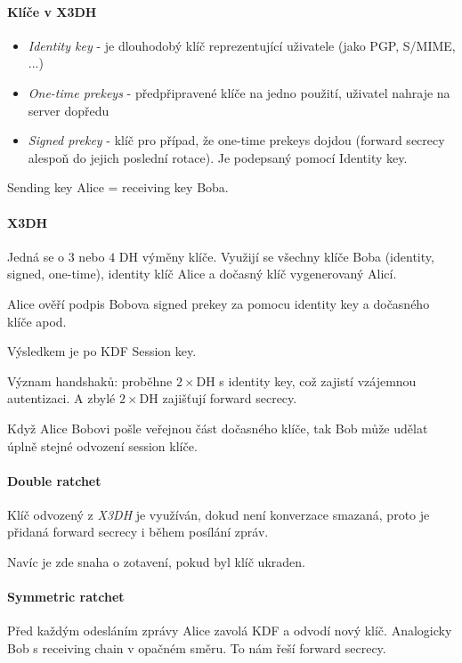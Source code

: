 \documentclass[10pt,a4paper]{article}
\begin{document}
\paragraph{Klíče v X3DH}
\begin{itemize}\setlength\itemsep{0em}
	\item \textit{Identity key} - je dlouhodobý klíč reprezentující uživatele (jako PGP, S/MIME, ...)
	\item \textit{One-time prekeys} - předpřipravené klíče na jedno použití, uživatel nahraje na server dopředu
	\item \textit{Signed prekey} - klíč pro případ, že one-time prekeys dojdou (forward secrecy alespoň do jejich poslední rotace). Je podepsaný pomocí Identity key.
\end{itemize}
Sending key Alice = receiving key Boba.


\paragraph{X3DH}
Jedná se o $ 3 $ nebo $ 4 $ DH výměny klíče.
Využijí se všechny klíče Boba (identity, signed, one-time), identity klíč Alice a dočasný klíč vygenerovaný Alicí.

Alice ověří podpis Bobova signed prekey za pomocu identity key a dočasného klíče apod.

Výsledkem je po KDF Session key.


Význam handshaků: proběhne $ 2 \times  $DH s identity key, což zajistí vzájemnou autentizaci. 
A zbylé $ 2 \times  $DH zajišťují forward secrecy.


Když Alice Bobovi pošle veřejnou část dočasného klíče, tak Bob může udělat úplně stejné odvození session klíče.


\paragraph{Double ratchet}
Klíč odvozený z \textit{X3DH} je využíván, dokud není konverzace smazaná, proto je přidaná forward secrecy i během posílání zpráv.

Navíc je zde snaha o zotavení, pokud byl klíč ukraden.


\paragraph{Symmetric ratchet}
Před každým odesláním zprávy Alice zavolá KDF a odvodí nový klíč.
Analogicky Bob s receiving chain v opačném směru. To nám řeší forward secrecy.
\end{document}
